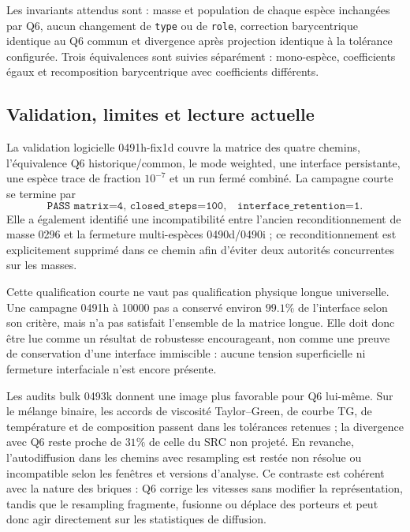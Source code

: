 \documentclass[11pt,a4paper]{article}
\begin{document}
Les invariants attendus sont : masse et population de chaque espèce inchangées par Q6, aucun changement de \texttt{type} ou de \texttt{role}, correction barycentrique identique au Q6 commun et divergence après projection identique à la tolérance configurée. Trois équivalences sont suivies séparément : mono-espèce, coefficients égaux et recomposition barycentrique avec coefficients différents.

\subsection{Validation, limites et lecture actuelle}

La validation logicielle 0491h-fix1d couvre la matrice des quatre chemins, l'équivalence Q6 historique/common, le mode weighted, une interface persistante, une espèce trace de fraction $10^{-7}$ et un run fermé combiné. La campagne courte se termine par
\begin{equation}
  \texttt{PASS matrix=4, closed\_steps=100,}
  \quad \texttt{interface\_retention=1}.
\end{equation}
Elle a également identifié une incompatibilité entre l'ancien reconditionnement de masse 0296 et la fermeture multi-espèces 0490d/0490i ; ce reconditionnement est explicitement supprimé dans ce chemin afin d'éviter deux autorités concurrentes sur les masses.

Cette qualification courte ne vaut pas qualification physique longue universelle. Une campagne 0491h à 10000 pas a conservé environ $99.1\%$ de l'interface selon son critère, mais n'a pas satisfait l'ensemble de la matrice longue. Elle doit donc être lue comme un résultat de robustesse encourageant, non comme une preuve de conservation d'une interface immiscible : aucune tension superficielle ni fermeture interfaciale n'est encore présente.

Les audits bulk 0493k donnent une image plus favorable pour Q6 lui-même. Sur le mélange binaire, les accords de viscosité Taylor--Green, de courbe TG, de température et de composition passent dans les tolérances retenues ; la divergence avec Q6 reste proche de $31\%$ de celle du SRC non projeté. En revanche, l'autodiffusion dans les chemins avec resampling est restée non résolue ou incompatible selon les fenêtres et versions d'analyse. Ce contraste est cohérent avec la nature des briques : Q6 corrige les vitesses sans modifier la représentation, tandis que le resampling fragmente, fusionne ou déplace des porteurs et peut donc agir directement sur les statistiques de diffusion.
\end{document}

